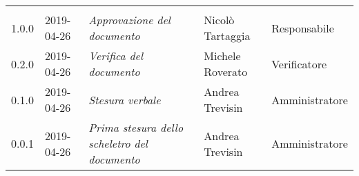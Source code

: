 \newpage 
\section*{}
	\begin{longtable}{C{2cm}|C{2.5cm}|C{4.5cm}|C{2.5cm}|C{3cm}}
	
	 &  &  &  &   \\
	\endhead
		
		1.0.0 & 2019-04-26 & \emph{Approvazione del documento} & Nicolò Tartaggia & Responsabile \\
		\hline
		
		0.2.0 & 2019-04-26 & \emph{Verifica del documento} & Michele Roverato & Verificatore \\
		\hline

		0.1.0 & 2019-04-26 & \emph{Stesura verbale} & Andrea Trevisin & Amministratore \\
		\hline
		
		0.0.1 & 2019-04-26 & \emph{Prima stesura dello scheletro del documento} & Andrea Trevisin & Amministratore \\
		
\end{longtable}



\clearpage
